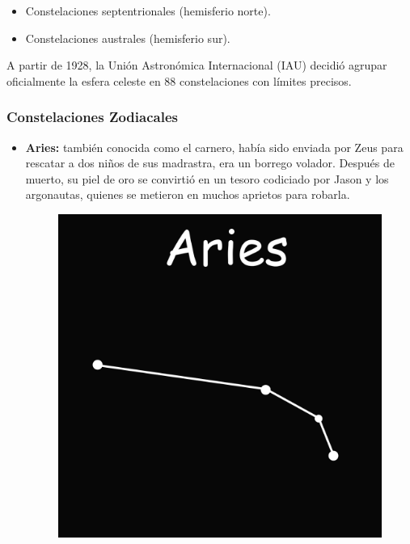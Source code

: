 \documentclass[10pt,a4paper]{article}
\begin{document}
\begin{itemize}
    \item Constelaciones septentrionales (hemisferio norte).
    \item Constelaciones australes (hemisferio sur).
\end{itemize}

A partir de 1928, la Unión Astronómica Internacional (IAU) decidió agrupar oficialmente la esfera celeste en 88 constelaciones con límites precisos. 

\subsubsection{Constelaciones Zodiacales}

\begin{itemize}
 \item \textbf{Aries:} también conocida como el carnero, había sido enviada por Zeus para rescatar a dos niños de sus madrastra, era un borrego volador. Después de muerto, su piel de oro se convirtió en un tesoro codiciado por Jason y los argonautas, quienes se metieron en muchos aprietos para robarla.
 
\begin{figure}[H]
\centering
\includegraphics[scale=0.18]{Imagenes/Aries_01}
\end{figure} 


\end{itemize}
\end{document}
